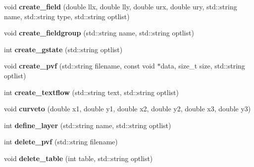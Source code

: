 \begin{DoxyCompactItemize}
\item 
\hypertarget{classPDFlib_adf5520b414e9426b73d375cfbb142a20}{void {\bfseries create\-\_\-field} (double llx, double lly, double urx, double ury, std\-::string name, std\-::string type, std\-::string optlist)}\label{classPDFlib_adf5520b414e9426b73d375cfbb142a20}

\item 
\hypertarget{classPDFlib_a44fb65e6533101477d39fde1730c92e6}{void {\bfseries create\-\_\-fieldgroup} (std\-::string name, std\-::string optlist)}\label{classPDFlib_a44fb65e6533101477d39fde1730c92e6}

\item 
\hypertarget{classPDFlib_ae2eabf14be762f2999aedd15a1626234}{int {\bfseries create\-\_\-gstate} (std\-::string optlist)}\label{classPDFlib_ae2eabf14be762f2999aedd15a1626234}

\item 
\hypertarget{classPDFlib_a208ad8e80e2733820d54e6fb4f6313b8}{void {\bfseries create\-\_\-pvf} (std\-::string filename, const void $\ast$data, size\-\_\-t size, std\-::string optlist)}\label{classPDFlib_a208ad8e80e2733820d54e6fb4f6313b8}

\item 
\hypertarget{classPDFlib_a9b80d68d417defcc9547b007c61b8877}{int {\bfseries create\-\_\-textflow} (std\-::string text, std\-::string optlist)}\label{classPDFlib_a9b80d68d417defcc9547b007c61b8877}

\item 
\hypertarget{classPDFlib_ae331bf087034fdc7961fbc95db5479a6}{void {\bfseries curveto} (double x1, double y1, double x2, double y2, double x3, double y3)}\label{classPDFlib_ae331bf087034fdc7961fbc95db5479a6}

\item 
\hypertarget{classPDFlib_a9ee76ee9081c4ef79c378ad4ed62df58}{int {\bfseries define\-\_\-layer} (std\-::string name, std\-::string optlist)}\label{classPDFlib_a9ee76ee9081c4ef79c378ad4ed62df58}

\item 
\hypertarget{classPDFlib_a60c311c1176f37551fade62b15e260fa}{int {\bfseries delete\-\_\-pvf} (std\-::string filename)}\label{classPDFlib_a60c311c1176f37551fade62b15e260fa}

\item 
\hypertarget{classPDFlib_a87643d5d18be98c83ae636b6e3013e8f}{void {\bfseries delete\-\_\-table} (int table, std\-::string optlist)}\label{classPDFlib_a87643d5d18be98c83ae636b6e3013e8f}


\end{DoxyCompactItemize}
